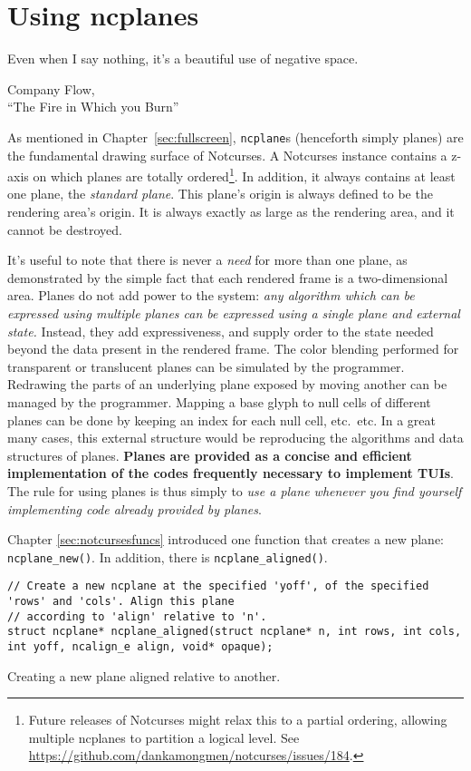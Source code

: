\section{Using ncplanes}
\label{sec:planes}
\epigraph{Even when I say nothing, it's a beautiful use of negative space.}{Company Flow,\\``The Fire in Which you Burn''}
\label{ncplane}
As mentioned in Chapter~\ref{sec:fullscreen}, \texttt{ncplane}s (henceforth
simply planes) are the fundamental drawing surface of Notcurses. A Notcurses
instance contains a z-axis on which planes are totally ordered\footnote{Future
releases of Notcurses might relax this to a partial ordering, allowing
multiple ncplanes to partition a logical level. See
\url{https://github.com/dankamongmen/notcurses/issues/184}.}. In addition, it
always contains at least one plane, the \textit{standard plane}. This plane's
origin is always defined to be the rendering area's origin. It is always
exactly as large as the rendering area, and it cannot be destroyed.

It's useful to note that there is never a \textit{need} for more than one plane,
as demonstrated by the simple fact that each rendered frame is a two-dimensional
area. Planes do not add power to the system: \textit{any algorithm which can be expressed using multiple planes can be expressed
using a single plane and external state.} Instead, they add expressiveness, and
supply order to the state needed beyond the data present in the rendered frame.
The color blending performed for transparent or translucent planes can be
simulated by the programmer. Redrawing the parts of an underlying plane exposed
by moving another can be managed by the programmer. Mapping a base glyph to
null cells of different planes can be done by keeping an index for each null
cell, etc.\ etc. In a great many cases, this external structure would be
reproducing the algorithms and data structures of planes. \textbf{Planes are
provided as a concise and efficient implementation of the codes frequently
necessary to implement TUIs}. The rule for using planes is thus simply to
\textit{use a plane whenever you find yourself implementing code already
provided by planes}.

Chapter \ref{sec:notcursesfuncs} introduced one function that creates a new
plane: \texttt{ncplane\_new()}. In addition, there is \texttt{ncplane\_aligned()}.

\begin{listing}[!htb]
\begin{verbatim}
// Create a new ncplane at the specified 'yoff', of the specified 'rows' and 'cols'. Align this plane
// according to 'align' relative to 'n'.
struct ncplane* ncplane_aligned(struct ncplane* n, int rows, int cols, int yoff, ncalign_e align, void* opaque);
\end{verbatim}
\caption{Creating a new plane aligned relative to another.}
\end{listing}

